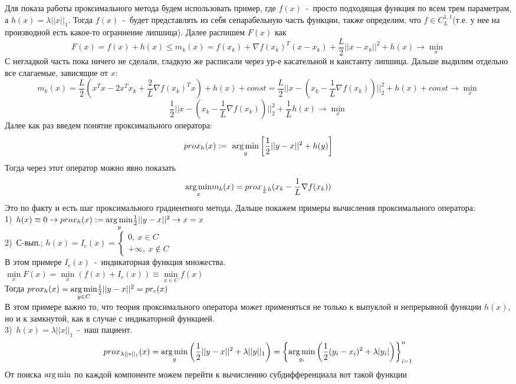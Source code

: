 Для показа работы проксимального метода будем использовать пример, где $f(x)$~-~просто подходящая функция по всем трем параметрам, а $h(x)=\lambda ||x||_1$. Тогда $f(x)$~-~будет представлять из себя сепарабельную часть функции, также определим, что $f \in C^{1,1}_L$(т.е. у нее на производной есть какое-то ограниение липшица). Далее распишем $F(x)$ как
$$
F(x)=f(x)+h(x) \leq m_k(x)=f(x_k)+\nabla f(x_k)^T(x-x_k)+\frac{L}{2}||x-x_k||^2+h(x) \to \underset{x}{\min}
$$
С негладкой часть пока ничего не сделали, гладкую же расписали через ур-е касательной и канстанту липшица. Дальше выдилим отдельно все слагаемые, зависящие от $x$:
$$
m_k(x)=\frac{L}{2}(x^Tx-2x^Tx_k+\frac{2}{L}\nabla f(x_k)^Tx)+h(x)+const=\frac{L}{2}||x-(x_k-\frac{1}{L}\nabla f(x_k))||^2_2+h(x)+const \to \underset{x}{\min}
$$
$$
\frac{1}{2}||x-(x_k-\frac{1}{L}\nabla f(x_k))||^2_2+\frac{1}{L}h(x) \to \underset{x}{\min}
$$
Далее как раз введем понятие проксимального оператора:\\
$$
prox_h(x):=~\underset{y}{\operatorname*{arg\,min}}\left[\frac{1}{2}||y-x||^2+h(y)\right]
$$
Тогда через этот оператор можно явно показать
$$
\underset{x}{\operatorname*{arg\,min}}m_k(x)=prox_{\frac{1}{L}h}(x_k-\frac{1}{L}\nabla f(x_k))
$$
Это по факту и есть шаг проксимального градиентного метода. Дальше покажем примеры вычисления проксимального оператора:\\
1)~$h(x) \equiv 0 \to prox_h(x):=\underset{y}{\operatorname*{arg\,min}} \frac{1}{2}||y-x||^2 \to x=x$\\
2)~С-вып.; $h(x)=I_c(x)=\begin{cases}
0,~x \in C\\
+\infty,~x \notin C
\end{cases}$\\
В этом примере $I_c(x)$~-~индикаторная функция множества.\\
$\underset{x}{\min}F(x)=\underset{x}{\min}(f(x)+I_c(x))\equiv \underset{x \in C}{\min}f(x)$\\
Тогда $prox_h(x)=\underset{y \in C}{\operatorname*{arg\,min}}\frac{1}{2}||y-x||^2=pr_c(x)$\\
В этом примере важно то, что теория проксимального оператора может применяться не только к выпуклой и непрерывной функции $h(x)$, но и к замкнутой, как в случае с индикаторной функцией.\\
3)~$h(x)=\lambda ||x||_1$~-~наш пациент.
$$
prox_{\lambda ||*||_1}(x)=\underset{y}{\operatorname*{arg\,min}}\left( \frac{1}{2}||y-x||^2+\lambda||y||_1\right)=
\left\{ \underset{y_i}{\operatorname*{arg\,min}}\left(\frac{1}{2}(y_i - x_i)^2+\lambda |y_i|\right) \right\}^n_{i=1}
$$
От поиска $\operatorname*{arg\,min}$ по каждой компоненте можем перейти к вычислению субдифференциала вот такой функции
